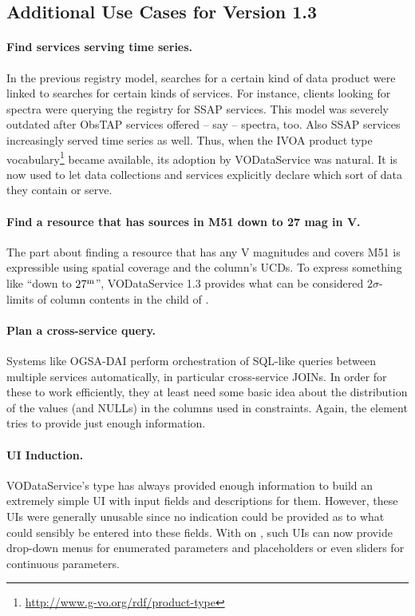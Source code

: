 \documentclass[11pt,a4paper]{ivoa}
\begin{document}
\subsection{Additional Use Cases for Version 1.3}

\paragraph{Find services serving time series.} In the previous registry
model, searches for a certain kind of data product were linked to
searches for certain kinds of services.  For instance, clients looking
for spectra were querying the registry for SSAP services.  This model
was severely outdated after ObsTAP services offered -- say -- spectra,
too.  Also SSAP services increasingly served time series as well.  Thus,
when the IVOA product type
vocabulary\footnote{\url{http://www.g-vo.org/rdf/product-type}} became
available, its adoption by VODataService was natural.  It is now used
to let data collections and services explicitly declare which sort of
data they contain or serve.

\paragraph{Find a resource that has sources in M51 down to 27 mag in V.}
The part about finding a resource that has any V magnitudes and covers M51 is
expressible using spatial coverage and the column's UCDs.  To express
something like ``down to $27^{\rm m}$'', VODataService 1.3 provides
what can be considered $2\sigma$-limits of column contents in the
 child of .

\paragraph{Plan a cross-service query.} Systems like OGSA-DAI
\citep{2011ASPC..442..579H} perform orchestration of SQL-like queries
between multiple services automatically, in particular cross-service
JOINs.  In order for these to work efficiently, they at least need some
basic idea about the distribution of the values (and NULLs) in the
columns used in constraints.  Again, the  element tries to
provide just enough information.

\paragraph{UI Induction.} VODataService's  type has
always provided enough information to build an extremely simple UI with
input fields and descriptions for them.  However, these UIs were
generally unusable since no indication could be provided as to what
could sensibly be entered into these fields.  With  on
, such UIs can now provide drop-down menus for
enumerated parameters and placeholders or even sliders for continuous
parameters.
\end{document}
